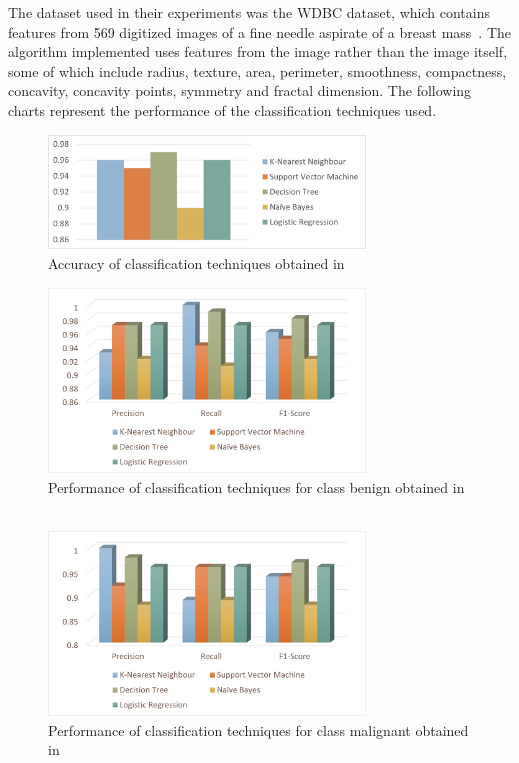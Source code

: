 The dataset used in their experiments was the WDBC dataset, which contains features from 569 digitized images of a fine needle aspirate of a breast mass~\cite{link3}. The algorithm implemented uses features from the image rather than the image itself, some of which include radius, texture, area, perimeter, smoothness, compactness, concavity, concavity points, symmetry and fractal dimension. The following charts represent the performance of the classification techniques used.

\begin{figure}[H]
    \centering
    \includegraphics[width=0.75\textwidth]{figures/Figure1.jpg}
    \caption{Accuracy of classification techniques obtained in ~\cite{carte2}}
    \label{fig:fig1}
\end{figure}

\begin{figure}[h!]
    \centering
    \includegraphics[width=0.75\textwidth]{figures/Figure2.jpg}
    \caption{Performance of classification techniques for class benign obtained in ~\cite{carte2}}
    \label{fig:fig2}
\end{figure}

\begin{figure}[h!]
    \centering
    \includegraphics[width=0.75\textwidth]{figures/Figure3.jpg}
    \caption{Performance of classification techniques for class malignant obtained in ~\cite{carte2}}
    \label{fig:fig3}
\end{figure}

